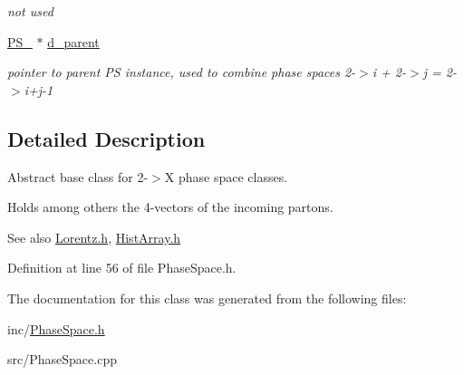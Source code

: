 \begin{DoxyCompactItemize}
\begin{DoxyCompactList}\small\item\em not used \end{DoxyCompactList}\item 
\hypertarget{classPS__2_abebb860c3c4a1c5054bc223d3aac4f45}{}\hyperlink{classPS__2}{P\+S\+\_} $\ast$ \hyperlink{classPS__2_abebb860c3c4a1c5054bc223d3aac4f45}{d\+\_\+parent}\label{classPS__2_abebb860c3c4a1c5054bc223d3aac4f45}

\begin{DoxyCompactList}\small\item\em pointer to parent P\+S instance, used to combine phase spaces 2-\/$>$i + 2-\/$>$j = 2-\/$>$i+j-\/1 \end{DoxyCompactList}\end{DoxyCompactItemize}


\subsection{Detailed Description}
Abstract base class for 2-\/$>$X phase space classes. 

Holds among others the 4-\/vectors of the incoming partons. \begin{DoxySeeAlso}{See also}
\hyperlink{Lorentz_8h}{Lorentz.\+h}, \hyperlink{HistArray_8h}{Hist\+Array.\+h} 
\end{DoxySeeAlso}


Definition at line 56 of file Phase\+Space.\+h.



The documentation for this class was generated from the following files\+:\begin{DoxyCompactItemize}
\item 
inc/\hyperlink{PhaseSpace_8h}{Phase\+Space.\+h}\item 
src/Phase\+Space.\+cpp\end{DoxyCompactItemize}
